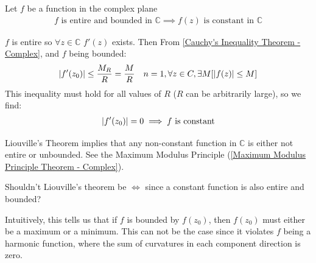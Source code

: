 \documentclass[12pt, english]{book}
\makeatletter
\renewenvironment{proof}[1][\proofname]{\par
	\pushQED{\qed}%
	\normalfont \topsep6\p@\@plus6\p@\relax
	\list{}{%
		\settowidth{\leftmargin}{\itshape\proofname:\hskip\labelsep}%
		\setlength{\labelwidth}{0pt}%
		\setlength{\itemindent}{-\leftmargin}%
	}%
	\item[\hskip\labelsep\itshape#1\@addpunct{:}]\ignorespaces
	}{ \popQED\endlist\@endpefalse}
\makeatother
\begin{document}
	\begin{theorem}
		\label{Liouville's Theorem - Complex}
		Let \(f\) be a function in the complex plane
		\begin{align*}
			f \text{ is entire and bounded in } \mathbb{C} 
			\implies f(z) \text{ is constant in } \mathbb{C}
		\end{align*}
	\end{theorem}
	\begin{proof}
		\(f\) is entire so \(\forall z \in \mathbb{C}\) \(f'(z)\) exists. Then From \cref{Cauchy's Inequality Theorem - Complex}, and \(f\) being bounded:
		\begin{align*}
			\abs{f'(z_0)} &\leq \frac{M_R}{R} = \frac{M}{R}&  n=1, \forall z \in C,\exists M[\abs{f(z)} \leq M]
		\end{align*}
		This inequality must hold for all values of \(R\) (\(R\) can be arbitrarily large), so we find: 
		\begin{align*}
			\abs{f'(z_0)} = 0 \implies f \text{ is constant}
		\end{align*}
	\end{proof}
	
	\begin{observation}
		Liouville's Theorem implies that any non-constant function in \(\mathbb{C}\) is either not entire or unbounded. See the Maximum Modulus Principle (\cref{Maximum Modulus Principle Theorem - Complex}).
	\end{observation}

	\begin{question}
		Shouldn't Liouville's theorem be \(\iff\) since a constant function is also entire and bounded?
	\end{question}

	Intuitively, this tells us that if \(f\) is bounded by \(f(z_0)\), then \(f(z_0)\) must either be a maximum or a minimum. This can not be the case since it violates \(f\) being a harmonic function, where the sum of curvatures in each component direction is zero.
	
\end{document}
